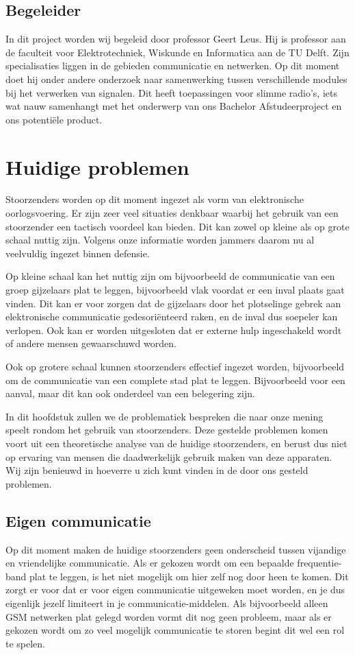 \documentclass[oneside, a4paper, openany]{memoir}
\begin{document}
\section{Begeleider}
In dit project worden wij begeleid door professor Geert Leus. Hij is professor aan de faculteit voor Elektrotechniek, Wiskunde en Informatica aan de TU Delft. Zijn specialisaties liggen in de gebieden communicatie en netwerken. Op dit moment doet hij onder andere onderzoek naar samenwerking tussen verschillende modules bij het verwerken van signalen. Dit heeft toepassingen voor slimme radio's, iets wat nauw samenhangt met het onderwerp van ons Bachelor Afstudeerproject en ons potentiële product.

\chapter{Huidige problemen}
Stoorzenders worden op dit moment ingezet als vorm van elektronische oorlogsvoering. Er zijn zeer veel situaties denkbaar waarbij het gebruik van een stoorzender een tactisch voordeel kan bieden. Dit kan zowel op kleine als op grote schaal nuttig zijn. Volgens onze informatie worden jammers daarom nu al veelvuldig ingezet binnen defensie.

Op kleine schaal kan het nuttig zijn om bijvoorbeeld de communicatie van een groep gijzelaars plat te leggen, bijvoorbeeld vlak voordat er een inval plaats gaat vinden. Dit kan er voor zorgen dat de gijzelaars door het plotselinge gebrek aan elektronische communicatie gedesoriënteerd raken, en de inval dus soepeler kan verlopen. Ook kan er worden uitgesloten dat er externe hulp ingeschakeld wordt of andere mensen gewaarschuwd worden.

Ook op grotere schaal kunnen stoorzenders effectief ingezet worden, bijvoorbeeld om de communicatie van een complete stad plat te leggen. Bijvoorbeeld voor een aanval, maar dit kan ook onderdeel van een belegering zijn.

In dit hoofdstuk zullen we de problematiek bespreken die naar onze mening speelt rondom het gebruik van stoorzenders. Deze gestelde problemen komen voort uit een theoretische analyse van de huidige stoorzenders, en berust dus niet op ervaring van mensen die daadwerkelijk gebruik maken van deze apparaten. Wij zijn benieuwd in hoeverre u zich kunt vinden in de door ons gesteld problemen.

\section{Eigen communicatie}
Op dit moment maken de huidige stoorzenders geen onderscheid tussen vijandige en vriendelijke communicatie. Als er gekozen wordt om een bepaalde frequentie-band plat te leggen, is het niet mogelijk om hier zelf nog door heen te komen. Dit zorgt er voor dat er voor eigen communicatie uitgeweken moet worden, en je dus eigenlijk jezelf limiteert in je communicatie-middelen. Als bijvoorbeeld alleen GSM netwerken plat gelegd worden vormt dit nog geen probleem, maar als er gekozen wordt om zo veel mogelijk communicatie te storen begint dit wel een rol te spelen.
\end{document}
